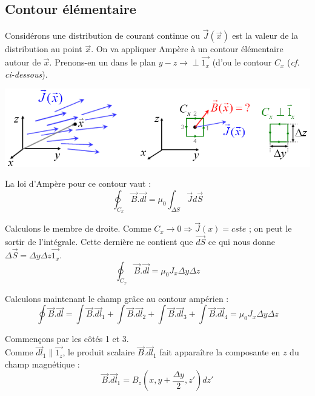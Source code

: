 \documentclass	[11pt, a4paper, openany]{book}
\begin{document}
\subsection{Contour élémentaire}
Considérons une distribution de courant continue ou $\vec{J}(\vec{x})$ est la valeur de la distribution au point $\vec{x}$. On va appliquer Ampère à un contour élémentaire autour de $\vec{x}$. Prenons-en un dans le plan $y-z \rightarrow \perp \vec{1_x}$ (d'ou le contour $C_x$ (\textit{cf. ci-dessous}).
\begin{center}
\includegraphics[scale=0.60]{magneto/image16.png}
\end{center}
La loi d'Ampère pour ce contour vaut : 
\begin{equation}
\oint_{C_x} \vec{B}.\vec{dl} = \mu_0\int_{\Delta S} \vec{J}d\vec{S}
\end{equation}

Calculons le membre de droite. Comme $C_x \rightarrow 0 \Rightarrow \vec{J}(x) = cste$ ; on peut le sortir de l'intégrale. Cette dernière ne contient que $\vec{dS}$ ce qui nous donne $\Delta \vec{S} = \Delta y\Delta z \vec{1_x}$.
\begin{equation}
\oint_{C_x} \vec{B}.\vec{dl} = \mu_0J_x \Delta y\Delta z
\end{equation}

Calculons maintenant le champ grâce au contour ampérien :
\begin{equation}
\oint \vec{B}.\vec{dl} = \int \vec{B}.\vec{dl}_1 + \int \vec{B}.\vec{dl}_2 + \int \vec{B}.\vec{dl}_3 + \int \vec{B}.\vec{dl}_4 = \mu_0J_x \Delta y\Delta z
\end{equation}

Commençons par les côtés 1 et 3.\\
Comme $\vec{dl}_1 \parallel \vec{1_z}$, le produit scalaire $\vec{B}.\vec{dl}_1$ fait apparaître la composante en $z$ du champ magnétique :
\begin{equation}
\vec{B}.\vec{dl}_1 = B_z(x, y + \frac{\Delta y}{2}, z')dz'
\end{equation}
\end{document}

